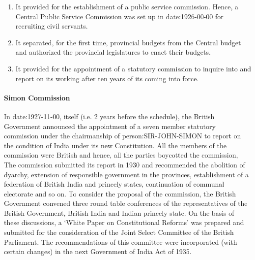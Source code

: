 \begin{multicol}{2}
\begin{enumerate}
  \item It provided for the establishment of a public service commission. Hence, a Central Public Service Commission was set up in \gls{date:1926-00-00} for recruiting civil servants.
  \item It separated, for the first time, provincial budgets from the Central budget and authorized the provincial legislatures to enact their budgets.
  \item It provided for the appointment of a statutory commission to inquire into and report on its working after ten years of its coming into force.
\end{enumerate}

\paragraph{Simon Commission}

In \gls{date:1927-11-00}, itself (i.e. 2 years before the schedule), the British Government announced the appointment of a seven member statutory commission under the chairmanship of \gls{person:SIR-JOHN-SIMON} to report on the condition of India under its new Constitution. All the members of the commission were British and hence, all the parties boycotted the commission, The commission submitted its report in 1930 and recommended the abolition of dyarchy, extension of responsible government in the provinces, establishment of a federation of British India and princely states, continuation of communal electorate and so on. To consider the proposal of the commission, the British Government convened three round table conferences of the representatives of the British Government, British India and Indian princely state. On the basis of these discussions, a `White Paper on Constitutional Reforms' was prepared and submitted for the consideration of the Joint Select Committee of the British Parliament. The recommendations of this committee were incorporated (with certain changes) in the next Government of India Act of 1935.


\end{multicol}
